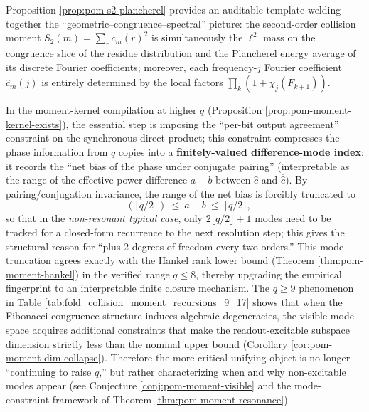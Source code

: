 \begin{remark}\label{rem:pom-closure-dim-mode-trunc}
Proposition \ref{prop:pom-s2-plancherel} provides an auditable template welding together the ``geometric--congruence--spectral'' picture: the second-order collision moment
\(
S_2(m)=\sum_r c_m(r)^2
\)
is simultaneously the \(\ell^2\) mass on the congruence slice of the residue distribution and the Plancherel energy average of its discrete Fourier coefficients; moreover, each frequency-\(j\) Fourier coefficient \(\widehat c_m(j)\) is entirely determined by the local factors \(\prod_k(1+\chi_j(F_{k+1}))\).

In the moment-kernel compilation at higher \(q\) (Proposition \ref{prop:pom-moment-kernel-exists}), the essential step is imposing the ``per-bit output agreement'' constraint on the synchronous direct product; this constraint compresses the phase information from \(q\) copies into a \textbf{finitely-valued difference-mode index}: it records the ``net bias of the phase under conjugate pairing'' (interpretable as the range of the effective power difference \(a-b\) between \(\widehat c\) and \(\overline{\widehat c}\)). By pairing/conjugation invariance, the range of the net bias is forcibly truncated to
\[
-(\lfloor q/2\rfloor)\ \le\ a-b\ \le\ \lfloor q/2\rfloor,
\]
so that in the \emph{non-resonant typical case}, only \(2\lfloor q/2\rfloor+1\) modes need to be tracked for a closed-form recurrence to the next resolution step; this gives the structural reason for ``plus 2 degrees of freedom every two orders.'' This mode truncation agrees exactly with the Hankel rank lower bound (Theorem \ref{thm:pom-moment-hankel}) in the verified range \(q\le 8\), thereby upgrading the empirical fingerprint to an interpretable finite closure mechanism.
The \(q\ge 9\) phenomenon in Table \ref{tab:fold_collision_moment_recursions_9_17} shows that when the Fibonacci congruence structure induces algebraic degeneracies, the visible mode space acquires additional constraints that make the readout-excitable subspace dimension strictly less than the nominal upper bound (Corollary \ref{cor:pom-moment-dim-collapse}). Therefore the more critical unifying object is no longer ``continuing to raise \(q\),'' but rather characterizing when and why non-excitable modes appear (see Conjecture \ref{conj:pom-moment-visible} and the mode-constraint framework of Theorem \ref{thm:pom-moment-resonance}).
\end{remark}

